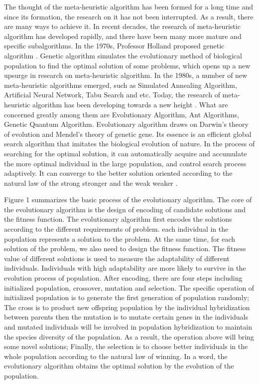 The thought of the meta-heuristic algorithm has been formed for a long time 
and since its formation, the research on it has not been interrupted. As a 
result, there are many ways to achieve it. In recent decades, the research of 
meta-heuristic algorithm has developed rapidly, and there have been many more 
mature and specific subalgorithms. In the 1970s, Professor Holland proposed 
genetic algorithm \cite{holland}. Genetic algorithm simulates the 
evolutionary method of biological population to find the optimal solution of 
some problems, which opens up a new upsurge in research on meta-heuristic 
algorithm. In the 1980s, a number of new meta-heuristic algorithms emerged, 
such as Simulated Annealing Algorithm, Artificial Neural Network, Tabu Search 
and etc. Today, the research of meta-heuristic algorithm has been developing 
towards a new height \cite{harman}. What are concerned greatly among them are 
Evolutionary Algorithm, Ant Algorithms, Genetic Quantum Algorithm.  
Evolutionary algorithm draws on Darwin's theory of evolution and Mendel's 
theory of genetic gene. Its essence is an efficient global search algorithm 
that imitates the biological evolution of nature. In the process of searching 
for the optimal solution, it can automatically acquire and accumulate the 
more optimal individual in the large population, and control search process 
adaptively. It can converge to the better solution oriented according to the 
natural law of the strong stronger and the weak weaker \cite{deb}.

Figure 1 summarizes the basic process of the evolutionary algorithm. The core 
of the evolutionary algorithm is the design of encoding of candidate 
solutions and the fitness function. The evolutionary algorithm first encodes 
the solutions according to the different requirements of problem. each 
individual in the population represents a solution to the problem. At the 
same time, for each solution of the problem, we also need to design the 
fitness function. The fitness value of different solutions is used to measure 
the adaptability of different individuals. Individuals with high adaptability 
are more likely to survive in the evolution process of population. After 
encoding, there are four steps including initialized population, crossover, 
mutation and selection. The specific operation of initialized population is 
to generate the first generation of population randomly; The cross is to 
product new offspring population by the individual hybridization between 
parents then the mutation is to mutate certain genes in the individuals and 
mutated individuals will be involved in population hybridization to maintain 
the species diversity of the population. As a result, the operation above 
will bring some novel solutions; Finally, the selection is to choose better 
individuals in the whole population according to the natural law of winning. 
In a word, the evolutionary algorithm obtains the optimal solution by the 
evolution of the population.



